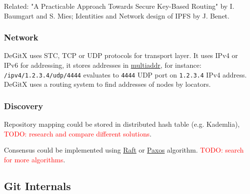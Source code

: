 \documentclass[12pt,oneside]{article}
\newcommand{\code}[1]{\texttt{#1}}
\newcommand{\todo}[1]{\textcolor{red}{TODO: #1}}
\begin{document}
Related: "A Practicable Approach Towards Secure Key-Based Routing" by I. Baumgart and S. Mies;
Identities and Network design of IPFS by J. Benet.

\subsubsection{Network}
DeGitX uses STC, TCP or UDP protocols for transport layer. It uses IPv4 or IPv6 for addressing,
it stores addresses in \href{https://github.com/multiformats/multiaddr}{multiaddr}, for instance:
\code{/ipv4/1.2.3.4/udp/4444} evaluates to \code{4444} UDP port on \code{1.2.3.4} IPv4 address.
DeGitX uses a routing system to find addresses of nodes by locators.

\subsubsection{Discovery}
\label{sec:discovery}
Repository mapping could be stored in distributed hash table (e.g. Kademlia),
\todo{research and compare different solutions}.

Consensus could be implemented using \href{https://raft.github.io/raft.pdf}{Raft} or
\href{http://www.cs.yale.edu/homes/aspnes/pinewiki/Paxos.html}{Paxos} algorithm.
\todo{search for more algorithms}.

\subsection{Git Internals}
\end{document}
